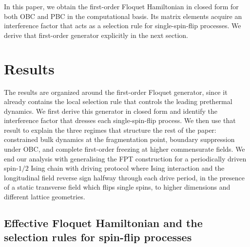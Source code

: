 \documentclass[aps,prb,reprint,twocolumn,amsmath,amssymb,citeautoscript]{revtex4-2}
\begin{document}
In this paper, we obtain the first-order Floquet Hamiltonian in closed
form for both OBC and PBC in the computational basis. Its matrix elements
acquire an interference factor that acts as a selection rule for
single-spin-flip processes. We derive that first-order generator
explicitly in the next section.

\section{Results}

The results are organized around the first-order Floquet generator, since it already contains the local selection rule that controls the leading prethermal dynamics. We first derive this generator in closed form and identify the interference factor that dresses each single-spin-flip process. We then use that result to explain the three regimes that structure the rest of the paper: constrained bulk dynamics at the fragmentation point, boundary suppression under OBC, and complete first-order freezing at higher commensurate fields. We end our analysis with generalising the FPT construction for a periodically driven spin-$1/2$ Ising chain with driving protocol where Ising interaction and the longitudinal field reverse sign halfway through each drive period, in the presence of a static transverse field which flips single spins, to higher dimensions and different lattice geometries. 

\subsection{Effective Floquet Hamiltonian and the selection rules for spin-flip processes}
\label{sec:HF}
\end{document}
